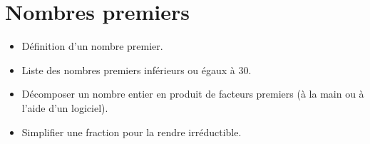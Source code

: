 \themaN
\graphicspath{{../../S23_Nombres_premiers/Images/}}

\chapter{Nombres premiers}
\label{S23}

\setlength{\doublerulesep}{0.3pt}

\begin{prerequis}
   \begin{itemize}
      \item Définition d'un nombre premier.
      \item Liste des nombres premiers inférieurs ou égaux à 30.
      \item[\com] Décomposer un nombre entier en produit de facteurs premiers (à la main ou à l'aide d'un logiciel).
      \item[\com] Simplifier une fraction pour la rendre irréductible.
   \end{itemize}
\end{prerequis}

\vfill

